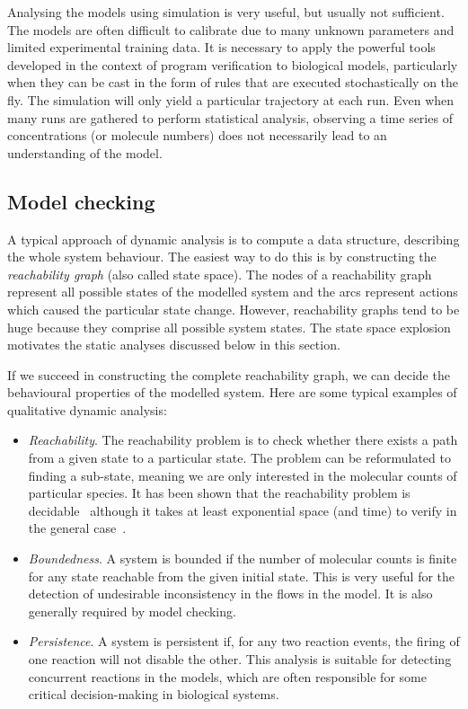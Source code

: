 \documentclass[11pt,a4paper]{report}
\begin{document}
Analysing the models using simulation is very useful, but usually not sufficient. The models are often difficult to calibrate due to many unknown parameters and limited experimental training data. It is necessary to apply the powerful tools developed in the context of program verification to biological models, particularly when
they can be cast in the form of rules that are executed stochastically on the fly. The simulation will only yield a particular trajectory at each run. Even when many runs are gathered to perform statistical analysis, observing a time series of concentrations (or molecule numbers) does not necessarily lead to an understanding of the model.

\subsection{Model checking}

A typical approach of dynamic analysis is to compute a data structure, describing the whole system behaviour. The easiest way to do this is by constructing the \emph{reachability graph} (also called state space). The nodes of a reachability graph represent all possible states of the modelled system and the arcs represent actions which caused the particular state change. However, reachability graphs tend to be huge because they comprise all possible system states. The state space explosion motivates the static analyses discussed below in this section. 

If we succeed in constructing the complete reachability graph, we can decide the behavioural properties of the modelled system. Here are some typical examples of qualitative dynamic analysis:

\begin{itemize}
	\item \emph{Reachability}. The reachability problem is to check whether there exists a path from a given state to a particular state. The problem can be reformulated to finding a sub-state, meaning we are only interested in the molecular counts of particular species. It has been shown that the reachability problem is decidable~\cite{kosaraju1982decidability} although it takes at least exponential space (and time) to verify in the general case~\cite{lipton1976reachability}.
	\item \emph{Boundedness}. A system is bounded if the number of molecular counts is finite for any state reachable from the given initial state. This is very useful for the detection of undesirable inconsistency in the flows in the model. It is also generally required by model checking.
	\item \emph{Persistence}. A system is persistent if, for any two reaction events, the firing of one reaction will not disable the other. This analysis is suitable for detecting concurrent reactions in the models, which are often responsible for some critical decision-making in biological systems.
\end{itemize}
\end{document}
